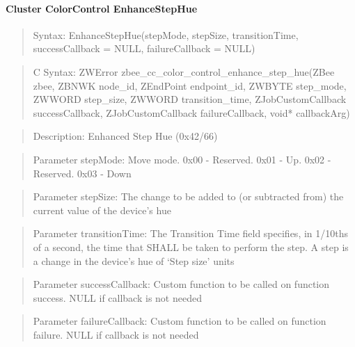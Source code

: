 \paragraph{Cluster ColorControl EnhanceStepHue}
\begin{quote}Syntax: EnhanceStepHue(stepMode, stepSize, transitionTime, successCallback = NULL, failureCallback = NULL)\end{quote}
\begin{quote}C Syntax: ZWError zbee\_cc\_color\_control\_enhance\_step\_hue(ZBee zbee, ZBNWK node\_id, ZEndPoint endpoint\_id, ZWBYTE step\_mode, ZWWORD step\_size, ZWWORD transition\_time, ZJobCustomCallback successCallback, ZJobCustomCallback failureCallback, void* callbackArg)\end{quote}
\begin{quote}Description: Enhanced Step Hue (0x42/66)\end{quote}
\begin{quote}Parameter stepMode: Move mode. 0x00 - Reserved. 0x01 - Up. 0x02 - Reserved. 0x03 - Down\end{quote}
\begin{quote}Parameter stepSize: The change to be added to (or subtracted from) the current value of the device’s hue\end{quote}
\begin{quote}Parameter transitionTime: The Transition Time field specifies, in 1/10ths of a second, the time that SHALL be taken to perform the step. A step is a change in the device’s hue of ‘Step size’ units\end{quote}
\begin{quote}Parameter successCallback: Custom function to be called on function success. NULL if callback is not needed\end{quote}
\begin{quote}Parameter failureCallback: Custom function to be called on function failure. NULL if callback is not needed\end{quote}


